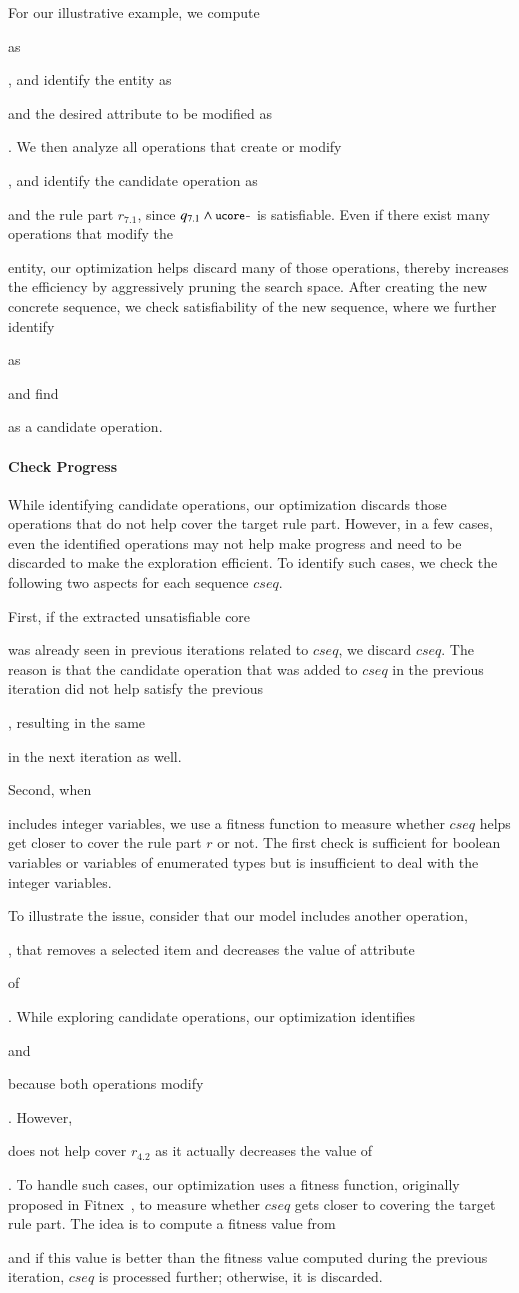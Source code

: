 For our illustrative example, we compute \subject{ucore-} as
\subject{ord.total > 0}, and identify the entity as \subject{Order} and the
desired attribute to be modified as \subject{total}. We then analyze all operations
that create or modify \subject{Order}, and identify the candidate operation
as \subject{AddItemToOrder} and the rule part $r_{7.1}$, since $q_{7.1} \wedge
\subject{ucore-}$ is satisfiable. Even if there exist
many operations that modify the \subject{Order} entity, our optimization
helps discard many of those operations, thereby increases the efficiency
by aggressively pruning the search space. 
After creating the new concrete sequence, we check satisfiability of the new
sequence, where we further identify \subject{ucore} as
\subject{cust.crLimit = 0 $\wedge$ cust.crLimit > 0} and find \subject{AddCreditLimit}
as a candidate operation.

\vskip -7pt
\paragraph*{Check Progress} While identifying candidate operations, our
optimization discards
those operations that do not help cover the target rule part. However,
in a few cases, even the identified operations may not help make progress and need
to be discarded to make the exploration efficient. To identify such cases, we
check the following two aspects for each sequence $cseq$.

First, if the extracted unsatisfiable core \subject{ucore} was already seen in
previous iterations related to $cseq$, we discard $cseq$. The reason
is that the candidate operation that was added to $cseq$ in the previous
iteration did not help satisfy the previous \subject{ucore}, resulting in the
same \subject{ucore} in the next iteration as well.

Second, when \subject{ucore} includes integer variables, we use a
fitness function to measure whether $cseq$ helps get closer to cover the rule
part $r$ or not. The first check is sufficient for boolean variables or
variables of enumerated types but is insufficient to deal with the integer
variables.

To illustrate the issue, consider that our model includes another operation,
\subject{RemoveItemFromOrder}, that removes a selected item and decreases the
value of attribute \subject{total} of \subject{Order}. While exploring candidate
operations, our optimization identifies \subject{AddItemToOrder} and
\subject{RemoveItemFromOrder} because both operations modify
\subject{total}. However, \subject{RemoveItemFromOrder} does not help cover
$r_{4.2}$ as it actually decreases the value of \subject{total}. To handle such
cases, our optimization uses a fitness function, originally proposed in
Fitnex~\cite{xie09:fitness}, to measure whether $cseq$ gets closer to covering
the target rule part. The idea is to compute a fitness value from
\subject{ucore} and if this value is better than the fitness value computed
during the previous iteration, $cseq$ is processed further; otherwise, it is
discarded.
